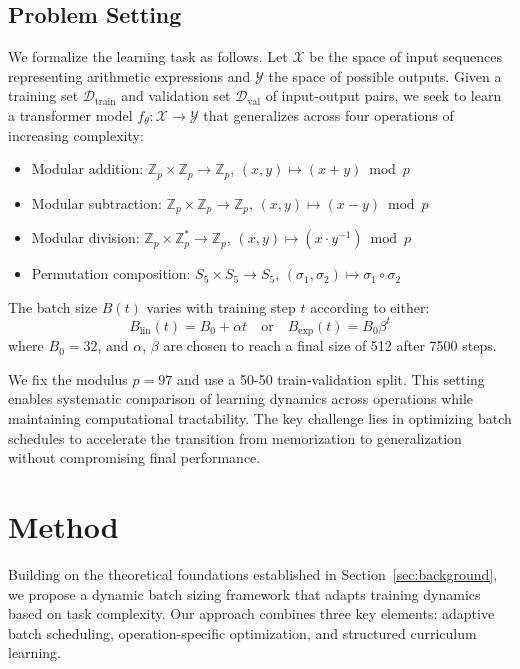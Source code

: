 \documentclass{article} %
\begin{document}
\subsection{Problem Setting}
We formalize the learning task as follows. Let $\mathcal{X}$ be the space of input sequences representing arithmetic expressions and $\mathcal{Y}$ the space of possible outputs. Given a training set $\mathcal{D}_{\text{train}}$ and validation set $\mathcal{D}_{\text{val}}$ of input-output pairs, we seek to learn a transformer model $f_\theta: \mathcal{X} \rightarrow \mathcal{Y}$ that generalizes across four operations of increasing complexity:

\begin{itemize}
    \item Modular addition: $\mathbb{Z}_p \times \mathbb{Z}_p \rightarrow \mathbb{Z}_p$, $(x,y) \mapsto (x + y) \bmod p$
    \item Modular subtraction: $\mathbb{Z}_p \times \mathbb{Z}_p \rightarrow \mathbb{Z}_p$, $(x,y) \mapsto (x - y) \bmod p$
    \item Modular division: $\mathbb{Z}_p \times \mathbb{Z}_p^* \rightarrow \mathbb{Z}_p$, $(x,y) \mapsto (x \cdot y^{-1}) \bmod p$
    \item Permutation composition: $S_5 \times S_5 \rightarrow S_5$, $(\sigma_1,\sigma_2) \mapsto \sigma_1 \circ \sigma_2$
\end{itemize}

The batch size $B(t)$ varies with training step $t$ according to either:
\begin{equation}
    B_{\text{lin}}(t) = B_0 + \alpha t \quad \text{or} \quad B_{\text{exp}}(t) = B_0 \beta^t
\end{equation}
where $B_0=32$, and $\alpha$, $\beta$ are chosen to reach a final size of 512 after 7500 steps.

We fix the modulus $p=97$ and use a 50-50 train-validation split. This setting enables systematic comparison of learning dynamics across operations while maintaining computational tractability. The key challenge lies in optimizing batch schedules to accelerate the transition from memorization to generalization without compromising final performance.

\section{Method}
\label{sec:method}

Building on the theoretical foundations established in Section~\ref{sec:background}, we propose a dynamic batch sizing framework that adapts training dynamics based on task complexity. Our approach combines three key elements: adaptive batch scheduling, operation-specific optimization, and structured curriculum learning.
\end{document}
